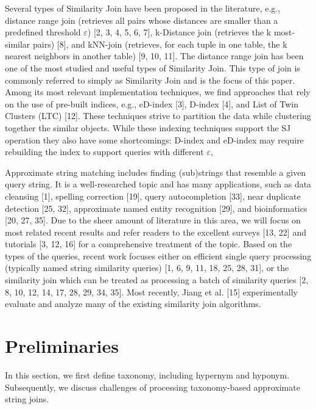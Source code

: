 \documentclass{sig-alternate}
\begin{document}
Several types of Similarity Join have been proposed in the
literature, e.g., distance range join (retrieves all pairs whose distances
are smaller than a predefined threshold $\varepsilon$) [2, 3, 4, 5, 6,
7], k-Distance join (retrieves the k most-similar pairs) [8], and
kNN-join (retrieves, for each tuple in one table, the k nearest neighbors
in another table) [9, 10, 11]. The distance range join
has been one of the most studied and useful types of Similarity
Join. This type of join is commonly referred to simply as Similarity
Join and is the focus of this paper. Among its most relevant
implementation techniques, we find approaches that rely
on the use of pre-built indices, e.g., eD-index [3], D-index [4],
and List of Twin Clusters (LTC) [12]. These techniques strive
to partition the data while clustering together the similar objects.
While these indexing techniques support the SJ operation
they also have some shortcomings: D-index and eD-index may
require rebuilding the index to support queries with different $\varepsilon$,

Approximate string matching includes finding (sub)strings
that resemble a given query string. It is a well-researched
topic and has many applications, such as data cleansing [1],
spelling correction [19], query autocompletion [33], near duplicate
detection [25, 32], approximate named entity recognition
[29], and bioinformatics [20, 27, 35].
Due to the sheer amount of literature in this area, we will
focus on most related recent results and refer readers to the
excellent surveys [13, 22] and tutorials [3, 12, 16] for a comprehensive
treatment of the topic.
Based on the types of the queries, recent work focuses either
on efficient single query processing (typically named string
similarity queries) [1, 6, 9, 11, 18, 25, 28, 31], or the similarity
join which can be treated as processing a batch of similarity
queries [2, 8, 10, 12, 14, 17, 28, 29, 34, 35]. Most recently,
Jiang et al. [15] experimentally evaluate and analyze many of
the existing similarity join algorithms.



\section{Preliminaries} \label{sec:preliminaries}



In this section, we first  define taxonomy, including
hypernym and hyponym. Subsequently,
we discuss challenges of processing taxonomy-based approximate string joins.
\end{document}
